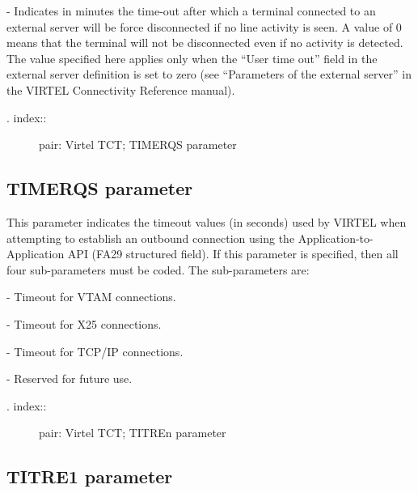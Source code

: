 \documentclass[letterpaper,10pt,english]{sphinxmanual}
\begin{document}
 - Indicates in minutes the time-out after which a terminal connected to an external server will be force disconnected if no line activity is seen. A value of 0 means that the terminal will not be disconnected even if no activity is detected. The value specified here applies only when the “User time out” field in the external server definition is set to zero (see “Parameters of the external server” in the VIRTEL Connectivity Reference manual).
\begin{description}
\item[{. index::}] \leavevmode
pair: Virtel TCT; TIMERQS parameter

\end{description}


\subsection{TIMERQS parameter}
\label{\detokenize{Installation_Guide:timerqs-parameter}}
\begin{sphinxVerbatim}[commandchars=\\\{\}]
 
\end{sphinxVerbatim}

This parameter indicates the timeout values (in seconds) used by VIRTEL when attempting to establish an outbound connection using the Application-to-Application API (FA29 structured field). If this parameter is specified, then all four sub-parameters must be coded. The sub-parameters are:

 - Timeout for VTAM connections.

 - Timeout for X25 connections.

 - Timeout for TCP/IP connections.

 - Reserved for future use.
\begin{description}
\item[{. index::}] \leavevmode
pair: Virtel TCT; TITREn parameter

\end{description}


\subsection{TITRE1 parameter}
\label{\detokenize{Installation_Guide:titre1-parameter}}
\begin{sphinxVerbatim}[commandchars=\\\{\}]
 
\end{sphinxVerbatim}
\end{document}
